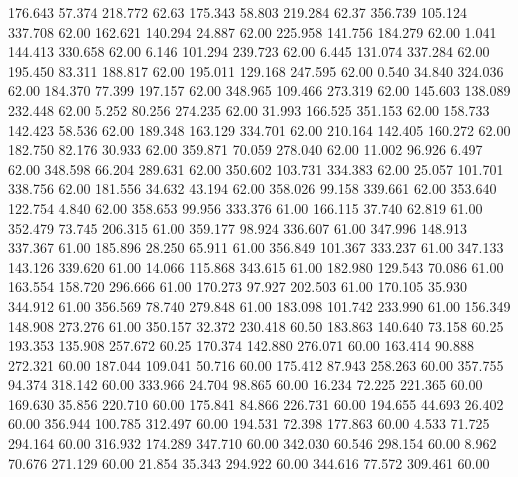  176.643   57.374  218.772        62.63
 175.343   58.803  219.284        62.37
 356.739  105.124  337.708        62.00
 162.621  140.294   24.887        62.00
 225.958  141.756  184.279        62.00
   1.041  144.413  330.658        62.00
   6.146  101.294  239.723        62.00
   6.445  131.074  337.284        62.00
 195.450   83.311  188.817        62.00
 195.011  129.168  247.595        62.00
   0.540   34.840  324.036        62.00
 184.370   77.399  197.157        62.00
 348.965  109.466  273.319        62.00
 145.603  138.089  232.448        62.00
   5.252   80.256  274.235        62.00
  31.993  166.525  351.153        62.00
 158.733  142.423   58.536        62.00
 189.348  163.129  334.701        62.00
 210.164  142.405  160.272        62.00
 182.750   82.176   30.933        62.00
 359.871   70.059  278.040        62.00
  11.002   96.926    6.497        62.00
 348.598   66.204  289.631        62.00
 350.602  103.731  334.383        62.00
  25.057  101.701  338.756        62.00
 181.556   34.632   43.194        62.00
 358.026   99.158  339.661        62.00
 353.640  122.754    4.840        62.00
 358.653   99.956  333.376        61.00
 166.115   37.740   62.819        61.00
 352.479   73.745  206.315        61.00
 359.177   98.924  336.607        61.00
 347.996  148.913  337.367        61.00
 185.896   28.250   65.911        61.00
 356.849  101.367  333.237        61.00
 347.133  143.126  339.620        61.00
  14.066  115.868  343.615        61.00
 182.980  129.543   70.086        61.00
 163.554  158.720  296.666        61.00
 170.273   97.927  202.503        61.00
 170.105   35.930  344.912        61.00
 356.569   78.740  279.848        61.00
 183.098  101.742  233.990        61.00
 156.349  148.908  273.276        61.00
 350.157   32.372  230.418        60.50
 183.863  140.640   73.158        60.25
 193.353  135.908  257.672        60.25
 170.374  142.880  276.071        60.00
 163.414   90.888  272.321        60.00
 187.044  109.041   50.716        60.00
 175.412   87.943  258.263        60.00
 357.755   94.374  318.142        60.00
 333.966   24.704   98.865        60.00
  16.234   72.225  221.365        60.00
 169.630   35.856  220.710        60.00
 175.841   84.866  226.731        60.00
 194.655   44.693   26.402        60.00
 356.944  100.785  312.497        60.00
 194.531   72.398  177.863        60.00
   4.533   71.725  294.164        60.00
 316.932  174.289  347.710        60.00
 342.030   60.546  298.154        60.00
   8.962   70.676  271.129        60.00
  21.854   35.343  294.922        60.00
 344.616   77.572  309.461        60.00
